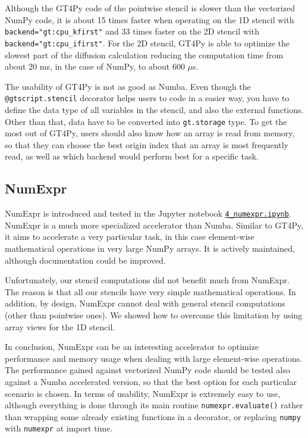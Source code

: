 \documentclass[12pt]{article}
\begin{document}
Although the GT4Py code of the pointwise stencil is slower than the vectorized NumPy code, it is about 15 times faster when operating on the 1D stencil with \texttt{backend="gt:cpu\_kfirst"} and 33 times faster on the 2D stencil with \texttt{backend="gt:cpu\_ifirst"}. For the 2D stencil, GT4Py is able to optimize the slowest part of the diffusion calculation reducing the computation time from about 20 ms, in the case of NumPy, to about 600 $\mu$s.

The usability of GT4Py is not as good as Numba. Even though the \texttt{@gtscript.stencil} decorator helps users to code in a easier way, you have to define the data type of all variables in the stencil, and also the external functions. Other than that, data have to be converted into \texttt{gt.storage} type. To get the most out of GT4Py, users should also know how an array is read from memory, so that they can choose the best origin index that an array is most frequently read, as well as which backend would perform best for a specific task.

\subsection{NumExpr}

NumExpr is introduced and tested in the Jupyter notebook \href{run:./4_numexpr.ipynb}{\texttt{4\_numexpr.ipynb}}. NumExpr is a much more specialized accelerator than Numba. Similar to GT4Py, it aims to accelerate a very particular task, in this case element-wise mathematical operations in very large NumPy arrays. It is actively maintained, although documentation could be improved.

Unfortunately, our stencil computations did not benefit much from NumExpr. The reason is that all our stencils have very simple mathematical operations. In addition, by design, NumExpr cannot deal with general stencil computations (other than pointwise ones). We showed how to overcome this limitation by using array views for the 1D stencil.

In conclusion, NumExpr can be an interesting accelerator to optimize performance and memory usage when dealing with large element-wise operations. The performance gained against vectorized NumPy code should be tested also against a Numba accelerated version, so that the best option for each particular scenario is chosen. In terms of usability, NumExpr is extremely easy to use, although everything is done through its main routine \texttt{numexpr.evaluate()} rather than wrapping some already existing functions in a decorator, or replacing \texttt{numpy} with \texttt{numexpr} at import time.
\end{document}
